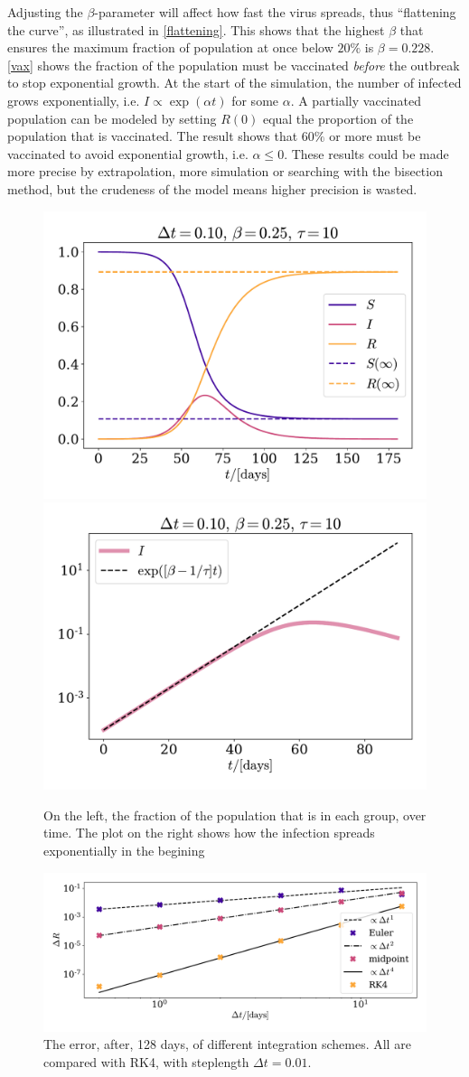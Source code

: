 \documentclass{article}
\begin{document}
    Adjusting the $\beta$-parameter will affect how fast the virus spreads, thus ``flattening the curve'', as illustrated in \autoref{flattening}.
    This shows that the highest $\beta$ that ensures the maximum fraction of population   at once below $20\%$ is $\beta=0.228$. 
    \autoref{vax} shows the fraction of the population must be vaccinated \emph{before} the outbreak to stop exponential growth. 
    At the start of the simulation, the number of infected grows exponentially, i.e. $I \propto \exp(\alpha t)$ for some $\alpha$.
    A partially vaccinated population can be modeled by setting $R(0)$ equal the proportion of the population that is vaccinated.
    The result shows that $60\%$ or more must be vaccinated to avoid exponential growth, i.e. $\alpha\leq 0$. 
    These results could be made more precise by extrapolation, more simulation or searching with the bisection method, but the crudeness of the model means higher precision is wasted.

    \begin{figure}[H]
        \centering
        \includegraphics[width=.49\textwidth]{../plots/2A/TestSIR}
        \includegraphics[width=.49\textwidth]{../plots/2A/TestI}
        \caption{On the left, the fraction of the population that is in each group, over time.
        The plot on the right shows how the infection spreads exponentially in the begining}
        \label{SIR}
    \end{figure}

    \begin{figure}[H]
        \centering
        \includegraphics[width=.6\textwidth]{../plots/2A/conv}
        \caption{The error, after, 128 days, of different integration schemes.
        All are compared with RK4, with steplength $\Delta t = 0.01$.}
        \label{conv det}
    \end{figure}
\end{document}
